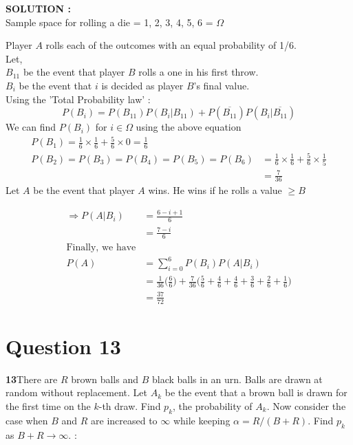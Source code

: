 \documentclass{article}
\begin{document}
\hspace{1em} \large{\textbf{SOLUTION :}} \\
    Sample space for rolling a die = {1, 2, 3, 4, 5, 6} = $\Omega$
    
    Player $A$ rolls each of the outcomes with an equal probability of 1/6.\\
    Let,\\
    $B_{11}$ be the event that player $B$ rolls a one in his first throw.\\
    $B_i$ be the event that $i$ is decided as player $B$'s final value.\\
    
    Using the 'Total Probability law' :
\begin{equation*}
    P(B_i) = P(B_{11})P(B_i|B_{11}) + P(\overline{B_{11}})P(B_i|\overline{B_{11}})
\end{equation*}
We can find $P(B_i)$ for $i\in \Omega$ using the above equation
\begin{align*}
    P(B_1)=\frac{1}{6}\times\frac{1}{6}+\frac{5}{6}\times0=\frac{1}{6}\\
    P(B_2)=P(B_3)=P(B_4)=P(B_5)=P(B_6)&=\frac{1}{6}\times\frac{1}{6}+\frac{5}{6}\times\frac{1}{5}\\
    &=\frac{7}{36}
\end{align*}
Let $A$ be the event that player $A$ wins. He wins if he rolls a value $\geq B$

\begin{align*}
    \Rightarrow P(A|B_i) &= \frac{6-i+1}{6}\\
    &= \frac{7-i}{6}\\
    \text{Finally, we have}\\
    P(A)&=\sum^6_{i=0} P(B_i)P(A|B_i)\\
    &= \frac{1}{36}\Big(\frac{6}{6}\Big)+\frac{7}{36}\Big(\frac{5}{6}+\frac{4}{6}+\frac{4}{6}+\frac{3}{6}+\frac{2}{6}+\frac{1}{6}\Big)\\
    &=\frac{37}{72}
\end{align*}
\section{Question 13}
\label{Q13}
\textbf{13}There are $R$ brown balls and $B$ black balls in an urn. Balls are drawn at random without replacement. Let $A_k$ be the event that a brown ball is drawn for the first time on the $k$-th draw. Find $p_k$, the probability of $A_k$. Now consider the case when $B$ and $R$ are increased to $\infty$ while keeping $\alpha = R/(B + R).$ Find $p_k$ as $B + R \rightarrow \infty$. : \\
\end{document}
